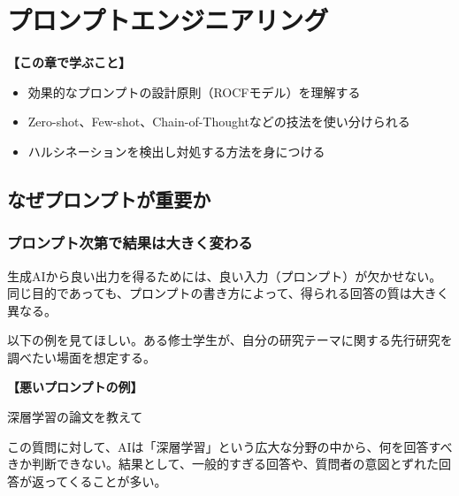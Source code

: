 \chapter{プロンプトエンジニアリング}
\label{chap2}

\begin{chapterbox}
\textbf{【この章で学ぶこと】}
\begin{itemize}
\item 効果的なプロンプトの設計原則（ROCFモデル）を理解する
\item Zero-shot、Few-shot、Chain-of-Thoughtなどの技法を使い分けられる
\item ハルシネーションを検出し対処する方法を身につける
\end{itemize}
\end{chapterbox}
\vspace{5mm}

\section{なぜプロンプトが重要か}
\label{sec:2.1}

\subsection{プロンプト次第で結果は大きく変わる}

生成AIから良い出力を得るためには、良い入力（プロンプト）が欠かせない。同じ目的であっても、プロンプトの書き方によって、得られる回答の質は大きく異なる。

以下の例を見てほしい。ある修士学生が、自分の研究テーマに関する先行研究を調べたい場面を想定する。

\begin{promptbox}
\textbf{【悪いプロンプトの例】}

深層学習の論文を教えて
\end{promptbox}

この質問に対して、AIは「深層学習」という広大な分野の中から、何を回答すべきか判断できない。結果として、一般的すぎる回答や、質問者の意図とずれた回答が返ってくることが多い。


